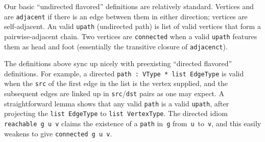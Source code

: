 


Our basic ``undirected flavored'' definitions are 
relatively standard.
Vertices  and  are \texttt{adjacent} if there is
an edge between them in either direction; vertices are self-adjacent.
An valid \texttt{upath} (undirected path) is list of 
valid vertices that form a  
pairwise-adjacent chain. Two vertices are \texttt{connected} when a valid \texttt{upath}
features them as head and foot (essentially the transitive 
closure of \texttt{adjacenct}).

The definitions above sync up nicely with preexisting ``directed
flavored'' definitions. 
For example, a directed \texttt{path~: VType~* list~EdgeType}
is valid when the \texttt{src} of the first edge in the list 
is the vertex supplied, and the subsequent edges are linked up 
in \texttt{src}/\texttt{dst} pairs
as one may expect. A straightforward lemma shows that 
any valid \texttt{path} is a valid \texttt{upath}, after projecting the
\texttt{list EdgeType} to \texttt{list VertexType}.
The directed idiom \texttt{reachable~g~u~v} claims the 
existence of a \texttt{path} in~\texttt{g} from~\texttt{u}~to~\texttt{v}, 
and this easily weakens to give \texttt{connected~g~u~v}.

